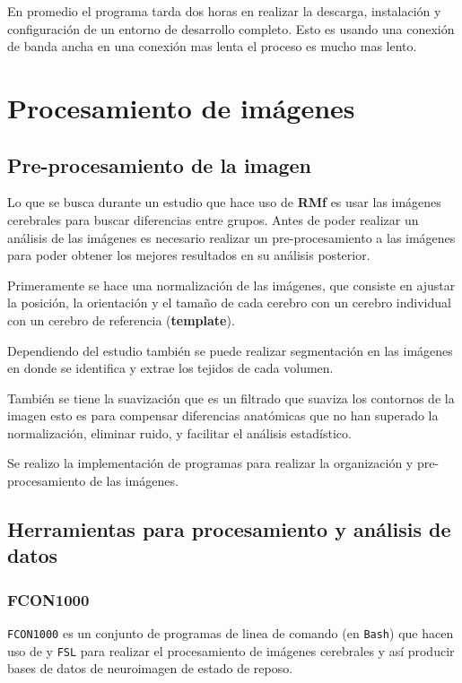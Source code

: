 \documentclass{article}
\begin{document}
En promedio el programa tarda dos horas en realizar la descarga, instalación y configuración de un entorno de desarrollo completo. Esto es usando una conexión de banda ancha en una conexión mas lenta el proceso es mucho mas lento.

\section{Procesamiento de imágenes}

\subsection{Pre-procesamiento de la imagen}

Lo que se busca durante un estudio que hace uso de \textbf{RMf} es usar las imágenes cerebrales para buscar diferencias entre grupos. Antes de poder realizar un análisis de las imágenes es necesario realizar un pre-procesamiento a las imágenes para poder obtener los mejores resultados en su análisis posterior. 

Primeramente  se hace una normalización de las imágenes, que consiste en ajustar la posición, la orientación y el tamaño de cada cerebro con un cerebro individual con un cerebro de referencia (\textbf{template}).

Dependiendo del estudio también se puede realizar segmentación en las imágenes en donde se identifica y extrae los tejidos de cada volumen.

También se tiene la suavización que es un filtrado que suaviza los contornos de la imagen esto es para compensar diferencias anatómicas que no han superado la normalización, eliminar ruido, y facilitar el análisis estadístico.

Se realizo la implementación de programas para realizar la organización y pre-procesamiento de las imágenes.

\subsection{Herramientas para procesamiento y análisis de datos}

\subsubsection{FCON1000}

\texttt{FCON1000} es un conjunto de programas de linea de comando (en \texttt{Bash}) que hacen uso de  y \texttt{FSL} para realizar el procesamiento de imágenes cerebrales y así producir bases de datos de neuroimagen de estado de reposo.
\end{document}
